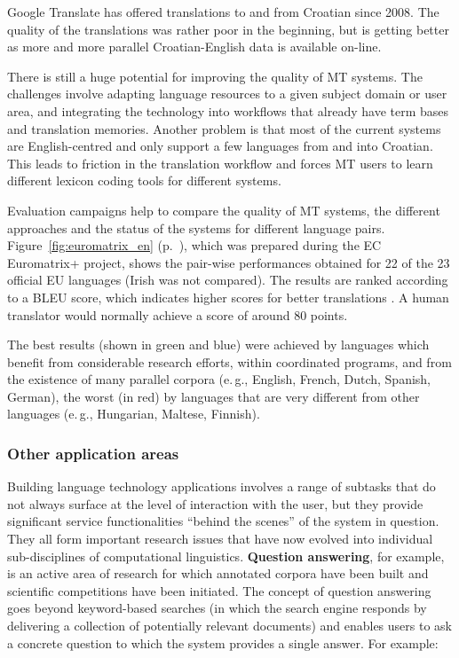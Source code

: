 \begin{multicols}{2}
Google Translate has offered translations to and from Croatian since 2008. The quality of the translations was rather poor in the beginning, but is getting better as more and more parallel Croatian-English data is available on-line.

There is still a huge potential for improving the quality of MT systems. The challenges involve adapting language resources to a given subject domain or user area, and integrating the technology into workflows that already have term bases and translation memories. Another problem is that most of the current systems are English-centred and only support a few languages from and into Croatian. This leads to friction in the translation workflow and forces MT users to learn different lexicon coding tools for different systems.

Evaluation campaigns help to compare the quality of MT systems, the different approaches and the status of the systems for different language pairs. Figure~\ref{fig:euromatrix_en} (p.~\pageref{fig:euromatrix_en}), which was prepared during the EC Euromatrix+ project, shows the pair-wise performances obtained for 22 of the 23 official EU languages (Irish was not compared). The results are ranked according to a BLEU score, which indicates higher scores for better translations \cite{pro6}. A human translator would normally achieve a score of around 80 points.

The best results (shown in green and blue) were achieved by languages which benefit from considerable research efforts, within coordinated programs, and from the existence of many parallel corpora (e.\,g., English, French, Dutch, Spanish, German), the worst (in red) by languages that are very different from other languages (e.\,g., Hungarian, Maltese, Finnish).

\subsubsection{Other application areas}

Building language technology applications involves a range of subtasks that do not always surface at the level of interaction with the user, but they provide significant service functionalities “behind the scenes” of the system in question. They all form important research issues that have now evolved into individual sub-disciplines of computational linguistics. \textbf{Question answering}, for example, is an active area of research for which annotated corpora have been built and scientific competitions have been initiated. The concept of question answering goes beyond keyword-based searches (in which the search engine responds by delivering a collection of potentially relevant documents) and enables users to ask a concrete question to which the system provides a single answer. For example:


\end{multicols}
